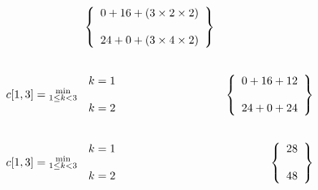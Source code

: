 \documentclass{report}
\begin{document}
\begin{eqnarray}
\begin{array}{c}
		\end{array}&
		\left\{
		\begin{array}{l}
			0 + 16 + (3 \times 2\times 2)\\
			\\
			24 + 0 + (3 \times 4\times 2)
		\end{array}
		\right\}\notag\\[0.7cm]
		\begin{array}{c}
			\\
			c[1,3] = \substack{\text{min}\\1\leq k < 3}\\
			\\
		\end{array}&
		\begin{array}{c}
			k=1\\
			\\
			k=2\\
		\end{array}&
		\left\{
		\begin{array}{l}
			0 + 16 + 12\\
			\\
			24 + 0  + 24
		\end{array}
		\right\}\notag\\[0.7cm]
		\begin{array}{c}
			\\
			c[1,3] = \substack{\text{min}\\1\leq k < 3}\\
			\\
		\end{array}&
		\begin{array}{c}
			k=1\\
			\\
			k=2\\
		\end{array}&
		\left\{
		\begin{array}{l}
			28\\
			\\
			48
		\end{array}
		\right\}\notag\\[0.7cm]
	\end{eqnarray}
\end{document}
